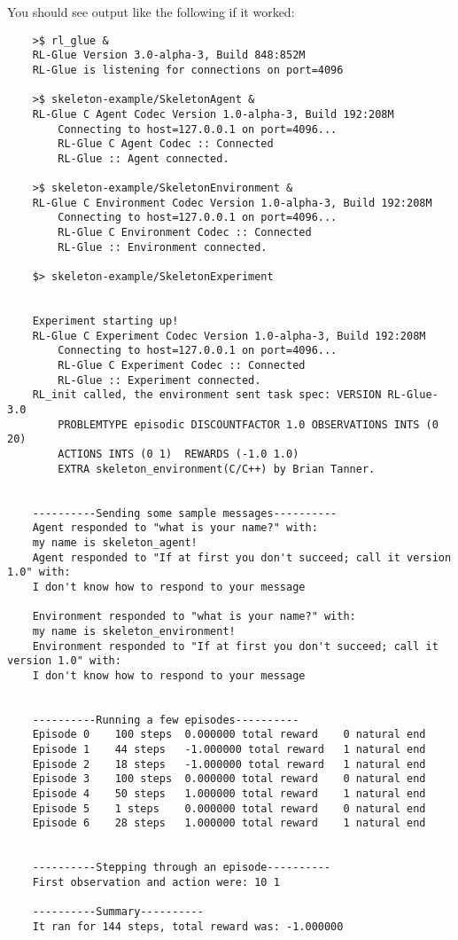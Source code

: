 \documentclass[11pt]{article}
\begin{document}
You should see output like the following if it worked:
\begin{verbatim}
	>$ rl_glue &
	RL-Glue Version 3.0-alpha-3, Build 848:852M
	RL-Glue is listening for connections on port=4096

	>$ skeleton-example/SkeletonAgent & 
	RL-Glue C Agent Codec Version 1.0-alpha-3, Build 192:208M
		Connecting to host=127.0.0.1 on port=4096...
		RL-Glue C Agent Codec :: Connected
		RL-Glue :: Agent connected.

	>$ skeleton-example/SkeletonEnvironment & 
	RL-Glue C Environment Codec Version 1.0-alpha-3, Build 192:208M
		Connecting to host=127.0.0.1 on port=4096...
		RL-Glue C Environment Codec :: Connected
		RL-Glue :: Environment connected.

	$> skeleton-example/SkeletonExperiment


	Experiment starting up!
	RL-Glue C Experiment Codec Version 1.0-alpha-3, Build 192:208M
		Connecting to host=127.0.0.1 on port=4096...
		RL-Glue C Experiment Codec :: Connected
		RL-Glue :: Experiment connected.
	RL_init called, the environment sent task spec: VERSION RL-Glue-3.0 
		PROBLEMTYPE episodic DISCOUNTFACTOR 1.0 OBSERVATIONS INTS (0 20) 
		ACTIONS INTS (0 1)  REWARDS (-1.0 1.0)  
		EXTRA skeleton_environment(C/C++) by Brian Tanner.
	

	----------Sending some sample messages----------
	Agent responded to "what is your name?" with: 
	my name is skeleton_agent!
	Agent responded to "If at first you don't succeed; call it version 1.0" with: 
	I don't know how to respond to your message

	Environment responded to "what is your name?" with: 
	my name is skeleton_environment!
	Environment responded to "If at first you don't succeed; call it version 1.0" with: 
	I don't know how to respond to your message


	----------Running a few episodes----------
	Episode 0	 100 steps 	0.000000 total reward	 0 natural end 
	Episode 1	 44 steps 	-1.000000 total reward	 1 natural end 
	Episode 2	 18 steps 	-1.000000 total reward	 1 natural end 
	Episode 3	 100 steps 	0.000000 total reward	 0 natural end 
	Episode 4	 50 steps 	1.000000 total reward	 1 natural end 
	Episode 5	 1 steps 	0.000000 total reward	 0 natural end 
	Episode 6	 28 steps 	1.000000 total reward	 1 natural end 


	----------Stepping through an episode----------
	First observation and action were: 10 1

	----------Summary----------
	It ran for 144 steps, total reward was: -1.000000
	
\end{verbatim}
\end{document}
